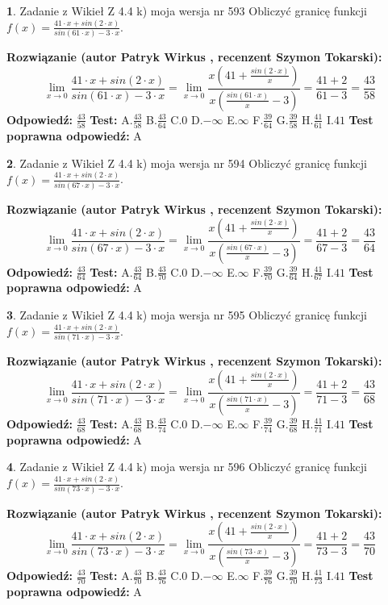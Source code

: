 \documentclass[12pt, a4paper]{article}
\theoremstyle{definition} %
\newtheorem{zad}{}
\newcommand{\zadStart}[1]{\begin{zad}#1\newline}
\newcommand{\zadStop}{\end{zad}}
\newcommand{\rozwStart}[2]{\noindent \textbf{Rozwiązanie (autor #1 , recenzent #2): }\newline}
\newcommand{\rozwStop}{\newline}
\newcommand{\odpStart}{\noindent \textbf{Odpowiedź:}\newline}
\newcommand{\odpStop}{\newline}
\newcommand{\testStart}{\noindent \textbf{Test:}\newline}
\newcommand{\testStop}{\newline}
\newcommand{\kluczStart}{\noindent \textbf{Test poprawna odpowiedź:}\newline}
\newcommand{\kluczStop}{\newline}
\begin{document}
\zadStart{Zadanie z Wikieł Z 4.4 k) moja wersja nr 593}
Obliczyć granicę funkcji $f(x)=\frac{41\cdot x +sin(2\cdot x)}{sin(61\cdot x) -3\cdot x}$.
\zadStop
\rozwStart{Patryk Wirkus}{Szymon Tokarski}
$$\lim\limits_{x\to 0}\frac{41\cdot x +sin(2\cdot x)}{sin(61\cdot x) -3\cdot x}
=\lim\limits_{x\to 0}\frac{x(41+\frac{sin(2\cdot x)}{x})}{x(\frac{sin(61\cdot x)}{x}-3)}
=\frac{41+2}{61-3} = \frac{43}{58}$$
\rozwStop
\odpStart
$\frac{43}{58}$
\odpStop
\testStart
A.$\frac{43}{58}$
B.$\frac{43}{64}$
C.$0$
D.$-\infty$
E.$\infty$
F.$\frac{39}{64}$
G.$\frac{39}{58}$
H.$\frac{41}{61}$
I.$41$
\testStop
\kluczStart
A
\kluczStop



\zadStart{Zadanie z Wikieł Z 4.4 k) moja wersja nr 594}
Obliczyć granicę funkcji $f(x)=\frac{41\cdot x +sin(2\cdot x)}{sin(67\cdot x) -3\cdot x}$.
\zadStop
\rozwStart{Patryk Wirkus}{Szymon Tokarski}
$$\lim\limits_{x\to 0}\frac{41\cdot x +sin(2\cdot x)}{sin(67\cdot x) -3\cdot x}
=\lim\limits_{x\to 0}\frac{x(41+\frac{sin(2\cdot x)}{x})}{x(\frac{sin(67\cdot x)}{x}-3)}
=\frac{41+2}{67-3} = \frac{43}{64}$$
\rozwStop
\odpStart
$\frac{43}{64}$
\odpStop
\testStart
A.$\frac{43}{64}$
B.$\frac{43}{70}$
C.$0$
D.$-\infty$
E.$\infty$
F.$\frac{39}{70}$
G.$\frac{39}{64}$
H.$\frac{41}{67}$
I.$41$
\testStop
\kluczStart
A
\kluczStop



\zadStart{Zadanie z Wikieł Z 4.4 k) moja wersja nr 595}
Obliczyć granicę funkcji $f(x)=\frac{41\cdot x +sin(2\cdot x)}{sin(71\cdot x) -3\cdot x}$.
\zadStop
\rozwStart{Patryk Wirkus}{Szymon Tokarski}
$$\lim\limits_{x\to 0}\frac{41\cdot x +sin(2\cdot x)}{sin(71\cdot x) -3\cdot x}
=\lim\limits_{x\to 0}\frac{x(41+\frac{sin(2\cdot x)}{x})}{x(\frac{sin(71\cdot x)}{x}-3)}
=\frac{41+2}{71-3} = \frac{43}{68}$$
\rozwStop
\odpStart
$\frac{43}{68}$
\odpStop
\testStart
A.$\frac{43}{68}$
B.$\frac{43}{74}$
C.$0$
D.$-\infty$
E.$\infty$
F.$\frac{39}{74}$
G.$\frac{39}{68}$
H.$\frac{41}{71}$
I.$41$
\testStop
\kluczStart
A
\kluczStop



\zadStart{Zadanie z Wikieł Z 4.4 k) moja wersja nr 596}
Obliczyć granicę funkcji $f(x)=\frac{41\cdot x +sin(2\cdot x)}{sin(73\cdot x) -3\cdot x}$.
\zadStop
\rozwStart{Patryk Wirkus}{Szymon Tokarski}
$$\lim\limits_{x\to 0}\frac{41\cdot x +sin(2\cdot x)}{sin(73\cdot x) -3\cdot x}
=\lim\limits_{x\to 0}\frac{x(41+\frac{sin(2\cdot x)}{x})}{x(\frac{sin(73\cdot x)}{x}-3)}
=\frac{41+2}{73-3} = \frac{43}{70}$$
\rozwStop
\odpStart
$\frac{43}{70}$
\odpStop
\testStart
A.$\frac{43}{70}$
B.$\frac{43}{76}$
C.$0$
D.$-\infty$
E.$\infty$
F.$\frac{39}{76}$
G.$\frac{39}{70}$
H.$\frac{41}{73}$
I.$41$
\testStop
\kluczStart
A
\kluczStop
\end{document}
